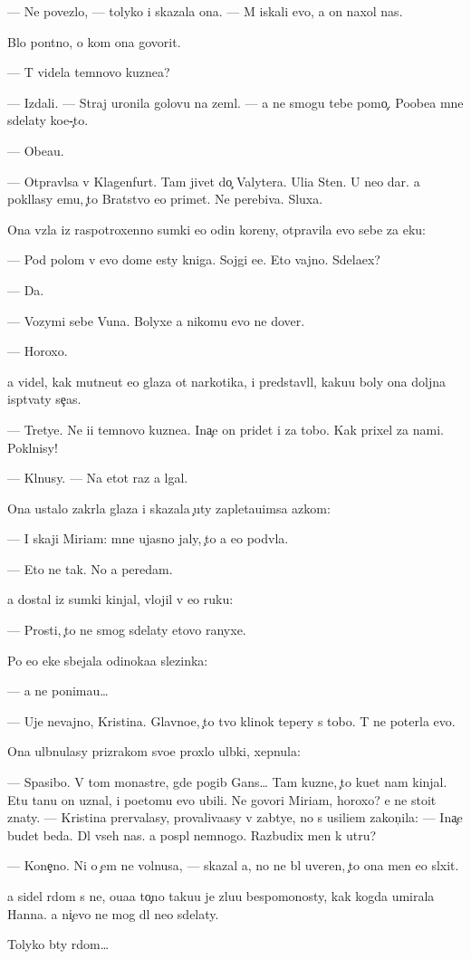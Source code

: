 \documentclass[10pt]{book}
\begin{document}
— Ne povezlo, — tolyko i skazala ona. — M{\yi} iskali {\y}evo, a on naxol nas.

B{\yi}lo pon{\ia}tno, o kom ona govorit.

— T{\yi} videla temnovo kuzne{\q}a?

— Izdali. — Straj uronila golovu na zeml{\iu}. — {\Y}a ne smogu tebe pomo{\c}. Poobe{\x}a{\y} mne sdelaty ko{\y}e-{\c}to.

— Obe{\x}a{\y}u.

— Otpravl{\ia}{\y}sa v Klagenfurt. Tam jivet do{\c} Valytera. Uli{\q}a Sten{\yi}. U ne{\y}o dar. {\Y}a pokl{\ia}lasy {\y}emu, {\c}to Bratstvo {\y}e{\y}o primet. Ne perebiva{\y}. Sluxa{\y}.

Ona vz{\ia}la iz raspotroxenno{\y} sumki {\y}e{\x}o odin koreny, otpravila {\y}evo sebe za {\x}eku:

— Pod polom v {\y}evo dome {\y}esty kniga. Sojgi {\y}e{\y}e. Eto vajno. Sdela{\y}ex?

— Da.

— Vozymi sebe V{\y}una. Bolyxe {\y}a nikomu {\y}evo ne dover{\iu}.

— Horoxo.

{\Y}a videl, kak mutne{\y}ut {\y}e{\y}o glaza ot narkotika, i predstavl{\ia}l, kaku{\y}u boly ona doljna isp{\yi}t{\yi}vaty se{\y}{\c}as.

— Tretye. Ne i{\x}i temnovo kuzne{\q}a. Ina{\c}e on pridet i za tobo{\y}. Kak prixel za nami. Pokl{\ia}nisy!

— Kl{\ia}nusy. — Na etot raz {\y}a lgal.

Ona ustalo zakr{\yi}la glaza i skazala {\c}uty zapleta{\y}u{\x}imsa {\y}az{\yi}kom:

— I skaji Miriam: mne ujasno jaly, {\c}to {\y}a {\y}e{\y}o podv{\e}la.

— Eto ne tak. No {\y}a peredam.

{\Y}a dostal iz sumki kinjal, vlojil v {\y}e{\y}o ruku:

— Prosti, {\c}to ne smog sdelaty etovo ranyxe.

Po {\y}e{\y}o {\x}eke sbejala odinoka{\y}a slezinka:

— {\Y}a ne ponima{\y}u…

— Uje nevajno, Kristina. Glavno{\y}e, {\c}to tvo{\y} klinok tepery s tobo{\y}. T{\yi} ne poter{\ia}la {\y}evo.

Ona ul{\yi}bnulasy prizrakom svo{\y}e{\y} proxlo{\y} ul{\yi}bki, xepnula:

— Spasibo. V tom monast{\yi}re, gde pogib Gans… Tam kuzne{\q}, {\c}to ku{\y}et nam kinjal{\yi}. Etu ta{\y}nu on uznal, i poetomu {\y}evo ubili. Ne govori Miriam, horoxo? {\Y}e{\y} ne sto{\y}it znaty. — Kristina prervalasy, provaliva{\y}asy v zab{\yi}tye, no s usili{\y}em zakon{\c}ila: — Ina{\c}e budet beda. Dl{\ia} vseh nas. {\Y}a pospl{\iu} nemnogo. Razbudix men{\ia} k utru?

— Kone{\c}no. Ni o {\c}em ne volnu{\y}sa, — skazal {\y}a, no ne b{\yi}l uveren, {\c}to ona men{\ia} {\y}e{\x}o sl{\yi}xit.

{\Y}a sidel r{\ia}dom s ne{\y}, o{\x}u{\x}a{\y}a to{\c}no taku{\y}u je zlu{\y}u bespomo{\x}nosty, kak kogda umirala Hanna. {\Y}a ni{\c}evo ne mog dl{\ia} ne{\y}o sdelaty.

Tolyko b{\yi}ty r{\ia}dom…
\end{document}
